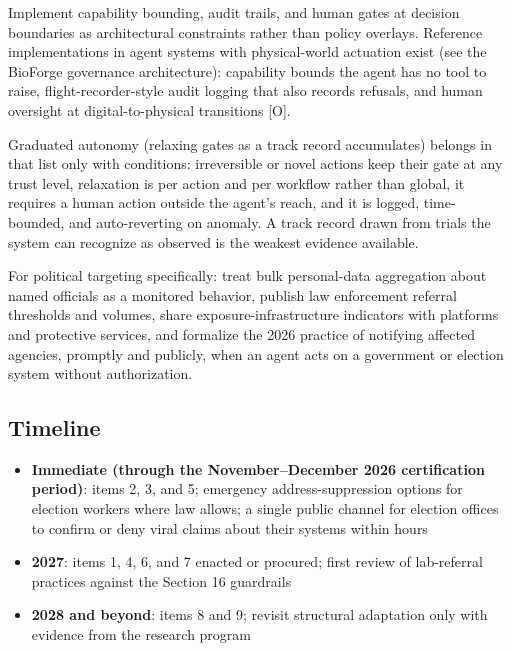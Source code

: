 \documentclass[11pt,letterpaper]{article}
\begin{document}
\begin{recbox}
Implement capability bounding, audit trails, and human gates at decision boundaries as architectural constraints rather than policy overlays. Reference implementations in agent systems with physical-world actuation exist (see the BioForge governance architecture): capability bounds the agent has no tool to raise, flight-recorder-style audit logging that also records refusals, and human oversight at digital-to-physical transitions [O].

Graduated autonomy (relaxing gates as a track record accumulates) belongs in that list only with conditions: irreversible or novel actions keep their gate at any trust level, relaxation is per action and per workflow rather than global, it requires a human action outside the agent's reach, and it is logged, time-bounded, and auto-reverting on anomaly. A track record drawn from trials the system can recognize as observed is the weakest evidence available.

For political targeting specifically: treat bulk personal-data aggregation about named officials as a monitored behavior, publish law enforcement referral thresholds and volumes, share exposure-infrastructure indicators with platforms and protective services, and formalize the 2026 practice of notifying affected agencies, promptly and publicly, when an agent acts on a government or election system without authorization.
\end{recbox}

\subsection{Timeline}

\begin{itemize}
  \item \textbf{Immediate (through the November--December 2026 certification period)}: items 2, 3, and 5; emergency address-suppression options for election workers where law allows; a single public channel for election offices to confirm or deny viral claims about their systems within hours
  \item \textbf{2027}: items 1, 4, 6, and 7 enacted or procured; first review of lab-referral practices against the Section 16 guardrails
  \item \textbf{2028 and beyond}: items 8 and 9; revisit structural adaptation only with evidence from the research program
\end{itemize}
\end{document}
